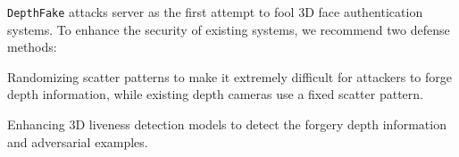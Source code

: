 \texttt{DepthFake} attacks server as the first attempt to fool 3D face authentication systems. To enhance the security of existing systems, we recommend two defense methods:
\begin{inparaenum}
\item Randomizing scatter patterns to make it extremely difficult for attackers to forge depth information, while existing depth cameras use a fixed scatter pattern.
\item  Enhancing 3D liveness detection models to detect the forgery depth information and adversarial examples.
\end{inparaenum}


%




